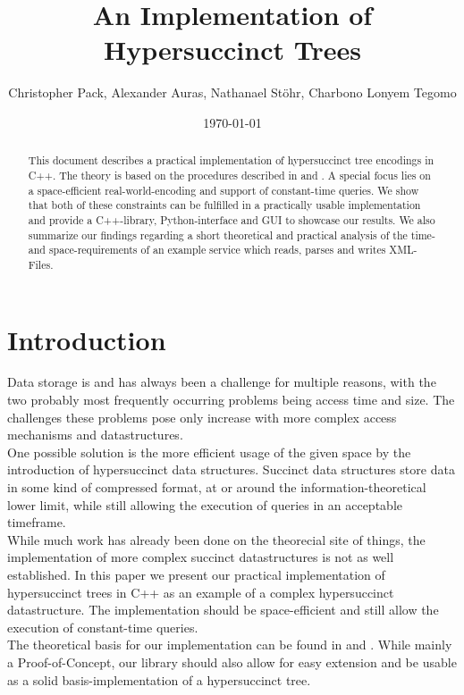 \documentclass{article}
\begin{document}
\title{An Implementation of Hypersuccinct Trees}
\author{Christopher Pack, Alexander Auras, Nathanael Stöhr, Charbono Lonyem Tegomo}
\date{\today}
\maketitle


\begin{abstract}
This document describes a practical implementation of hypersuccinct tree encodings in C++. The theory is based on the procedures described in \cite{farzanMunro} and \cite{universalSuccinct}. A special focus lies on a space-efficient real-world-encoding and support of constant-time queries. We show that both of these constraints can be fulfilled in a practically usable implementation and provide a C++-library, Python-interface and GUI to showcase our results. We also summarize our findings regarding a short theoretical and practical analysis of the time- and space-requirements of an example service which reads, parses and writes XML-Files.

\end{abstract}

\tableofcontents

\section{Introduction}
Data storage is and has always been a challenge for multiple reasons, with the two probably most frequently occurring problems being access time and size. The challenges these problems pose only increase with more complex access mechanisms and datastructures.\\
One possible solution is the more efficient usage of the given space by the introduction of hypersuccinct data structures. Succinct data structures store data in some kind of compressed format, at or around the information-theoretical lower limit, while still allowing the execution of queries in an acceptable timeframe.\\
While much work has already been done on the theorecial site of things, the implementation of more complex succinct datastructures is not as well established. In this paper we present our practical implementation of hypersuccinct trees in C++ as an example of a complex hypersuccinct datastructure. The implementation should be space-efficient and still allow the execution of constant-time queries.\\
The theoretical basis for our implementation can be found in \cite{farzanMunro} and \cite{universalSuccinct}. While mainly a Proof-of-Concept, our library should also allow for easy extension and be usable as a solid basis-implementation of a hypersuccinct tree.
\end{document}
